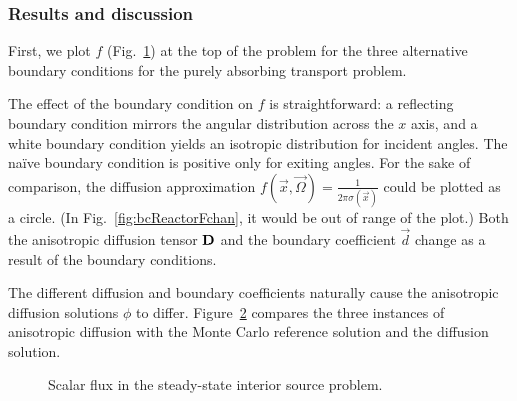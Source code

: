 \subsubsection{Results and discussion}

First, we plot $f$ (Fig.~\ref{fig:bcReactorF}) at the top of the problem for
the three alternative boundary conditions for the purely absorbing transport
problem.

\begin{figure}[tb]
  \centering
  \subfloat[$f(2.5,10,\omega)$]{%
    \hspace{-.25in}%
   \label{fig:bcReactorFchan}%
  }%
  \subfloat[$f(1.5,10,\omega)$]{%
    \hspace{-.25in}%
    
  }%
  \label{fig:bcReactorF}
\end{figure}

The effect of the boundary condition on $f$ is straightforward: a reflecting boundary
condition mirrors the angular distribution across the $x$ axis, and a white
boundary condition yields an isotropic distribution for incident angles. The
na\"ive boundary condition is positive only for exiting angles. For the sake of
comparison, the diffusion approximation $f(\vec{x},\vec{\Omega}) =
\frac{1}{2\pi \sigma(\vec{x})}$ could be plotted as a circle. (In
Fig.~\ref{fig:bcReactorFchan}, it would be out of range of the plot.) Both the
anisotropic diffusion tensor $\mathbf{D}$ and the boundary coefficient
$\vec{d}$ change as a result of the boundary conditions.

The different diffusion and boundary coefficients naturally cause the
anisotropic diffusion solutions $\phi$ to differ. Figure~\ref{fig:bcReactorFlux}
compares the three instances of anisotropic diffusion with the Monte Carlo
reference solution and the diffusion solution.

\begin{figure}[htb]
  \centering
  \hspace{-.25in}%
  
  \caption{Scalar flux in the steady-state interior source problem.}
  \label{fig:bcReactorFlux}
\end{figure}

